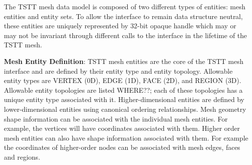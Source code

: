 The TSTT mesh data model is composed of two different types of
entities: mesh entities and entity sets.  To allow the interface to
remain data structure neutral, these entities are uniquely represented
by 32-bit opaque handle which may or may not be invariant through
different calls to the interface in the lifetime of the TSTT mesh.

{\bf Mesh Entity Definition}: TSTT mesh entities are the core of the
TSTT mesh interface and are defined by their entity type and entity
topology.  Allowable entity types are VERTEX (0D), EDGE (1D), FACE
(2D), and REGION (3D).  Allowable entity topologies are listed
WHERE??; each of these topologies has a unique entity type associated
with it.  Higher-dimensional entities are defined by lower-dimensional
entities using canonical ordering relationships.  Mesh geometry shape
information can be associated with the individual mesh entities. For
example, the vertices will have coordinates associated with
them. Higher order mesh entities can also have shape information
associated with them. For example the coordinates of higher-order
nodes can be associated with mesh edges, faces and regions.


